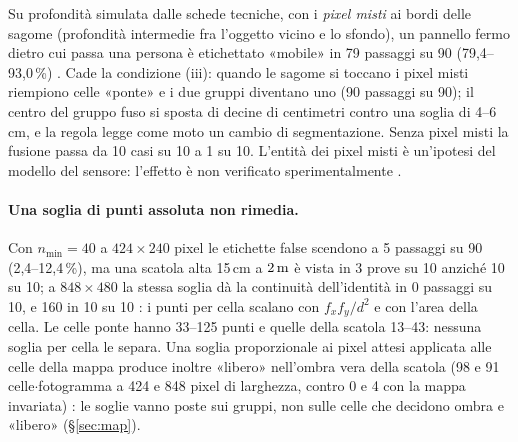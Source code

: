 \begin{controesempio}\label{ctr:sti-misti}
Su profondità simulata dalle schede tecniche, con i \emph{pixel misti} ai bordi delle sagome (profondità intermedie fra l'oggetto vicino e lo sfondo), un pannello fermo dietro cui passa una persona è etichettato «mobile» in 79 passaggi su 90 (79,4--93,0\,\%) . Cade la condizione (iii): quando le sagome si toccano i pixel misti riempiono celle «ponte» e i due gruppi diventano uno (90 passaggi su 90); il centro del gruppo fuso si sposta di decine di centimetri contro una soglia di 4--6\,cm, e la regola legge come moto un cambio di segmentazione. Senza pixel misti la fusione passa da 10 casi su 10 a 1 su 10. L'entità dei pixel misti è un'ipotesi del modello del sensore: l'effetto è non verificato sperimentalmente .
\end{controesempio}

\paragraph{Una soglia di punti assoluta non rimedia.} Con $n_{\min}=40$ a $424\times240$ pixel le etichette false scendono a 5 passaggi su 90 (2,4--12,4\,\%), ma una scatola alta 15\,cm a $2\,\mathrm{m}$ è vista in 3 prove su 10 anziché 10 su 10; a $848\times480$ la stessa soglia dà la continuità dell'identità in 0 passaggi su 10, e 160 in 10 su 10 : i punti per cella scalano con $f_xf_y/d^2$ e con l'area della cella. Le celle ponte hanno 33--125 punti e quelle della scatola 13--43: nessuna soglia per cella le separa. Una soglia proporzionale ai pixel attesi applicata alle celle della mappa produce inoltre «libero» nell'ombra vera della scatola (98 e 91 celle$\cdot$fotogramma a 424 e 848 pixel di larghezza, contro 0 e 4 con la mappa invariata) : le soglie vanno poste sui gruppi, non sulle celle che decidono ombra e «libero» (\S\ref{sec:map}).


